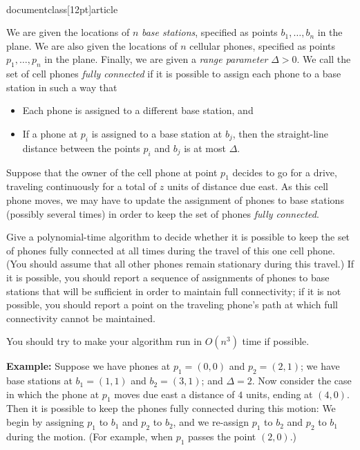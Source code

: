 \\documentclass[12pt]{article}
\begin{document}
\begin{enumerate}
We are given the locations of $n$ {\em base stations},
specified as points $b_1, \ldots, b_n$
in the plane.
We are also given the locations of $n$ cellular phones,
specified as points $p_1, \ldots, p_n$ in the plane.
Finally, we are given a {\em range parameter} $\Delta > 0$.
We call the set of cell phones {\em fully connected} if
it is possible to assign each phone to a base station
in such a way that
\begin{itemize}
\item Each phone is assigned to a different base station, and
\item If a phone at $p_i$ is assigned to a base
station at $b_j$, then the straight-line distance between the
points $p_i$ and $b_j$ is at most $\Delta$.
\end{itemize}

Suppose that the owner of the cell phone at point $p_1$
decides to go for a drive, traveling
continuously for a total of $z$ units of distance due east.
As this cell phone moves, we may have to update the
assignment of phones to base stations (possibly several times)
in order to keep the set of phones
{\em fully connected}.

Give a polynomial-time algorithm to decide whether
it is possible to keep the set of phones fully connected
at all times during the travel of this one cell phone.
(You should assume that all other phones remain stationary
during this travel.)
If it is possible, you should report a sequence of assignments of phones
to base stations
that will be sufficient in order to maintain full connectivity;
if it is not possible, you should report a point on the traveling phone's path
at which full connectivity cannot be maintained.

You should try to make your algorithm run in $O(n^3)$ time if possible.

{\bf Example:} Suppose we have phones at $p_1 = (0,0)$
and $p_2 = (2,1)$; we have base stations at
$b_1 = (1,1)$ and $b_2 = (3,1)$; and $\Delta = 2$.
Now consider the case in which the phone at $p_1$ moves
due east a distance of $4$ units, ending at $(4,0)$.
Then it is possible to keep the phones fully connected
during this motion:
We begin by assigning $p_1$ to $b_1$ and $p_2$ to $b_2$,
and we re-assign $p_1$ to $b_2$ and $p_2$ to $b_1$ during the motion.
(For example, when $p_1$ passes the point $(2,0)$.)


\end{enumerate}
\end{document}
